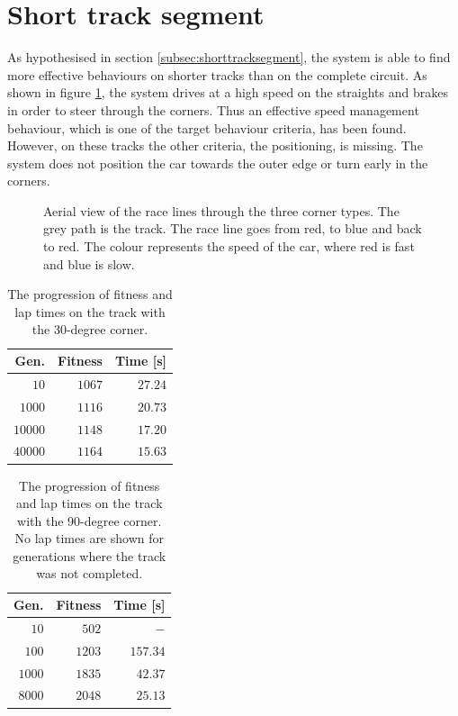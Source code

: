 \section{Short track segment}
\label{result:short}
As hypothesised in section \ref{subsec:shorttracksegment}, the system is able to find more effective behaviours on shorter tracks than on the complete circuit. As shown in figure \ref{fig:short_racelines}, the system drives at a high speed on the straights and brakes in order to steer through the corners. Thus an effective speed management behaviour, which is one of the target behaviour criteria, has been found. However, on these tracks the other criteria, the positioning, is missing. The system does not position the car towards the outer edge or turn early in the corners. 

\begin{figure}[H]
    \centering
    \qquad
    \qquad
    \caption{Aerial view of the race lines through the three corner types. The grey path is the track. The race line goes from red, to blue and back to red. The colour represents the speed of the car, where red is fast and blue is slow.}
    \label{fig:short_racelines}
\end{figure}

\begin{table}[H] 
  \centering
  \begin{tabular}{rrr}
    \toprule
    Gen. & Fitness & Time [s]\\
    \midrule
    $10$    & $1067$     & $27.24$  \\
    $1000$   & $1116$    & $20.73$  \\
    $10000$  & $1148$    & $17.20$  \\
    $40000$  & $1164$    & $15.63$  \\
    \bottomrule
  \end{tabular}
  \caption{The progression of fitness and lap times on the track with the 30-degree corner.}
  \label{tab:30deg}
\end{table}

\begin{table}[H] 
  \centering
  \begin{tabular}{rrr}
    \toprule
    Gen. & Fitness & Time [s]\\
    \midrule
    $10$    & $502$     & $-$       \\
    $100$   & $1203$    & $157.34$  \\
    $1000$  & $1835$    & $42.37$   \\
    $8000$  & $2048$    & $25.13$   \\
    \bottomrule
  \end{tabular}
  \caption{The progression of fitness and lap times on the track with the 90-degree corner. No lap times are shown for generations where the track was not completed.}
  \label{tab:90deg}
\end{table}

